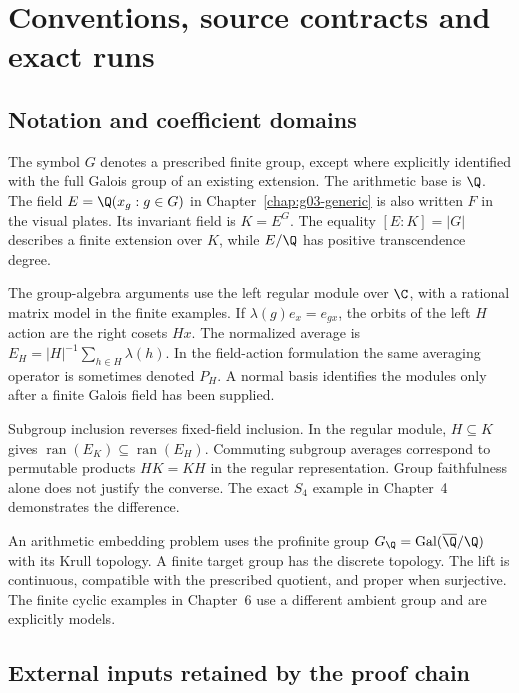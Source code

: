 \chapter{Conventions, source contracts and exact runs}
\label{app:g09-evidence}

\section{Notation and coefficient domains}

The symbol $G$ denotes a prescribed finite group, except where explicitly identified with the full Galois group of an existing extension. The arithmetic base is $\Q$. The field $E=\Q(x_g:g\in G)$ in Chapter~\ref{chap:g03-generic} is also written $F$ in the visual plates. Its invariant field is $K=E^G$. The equality $[E:K]=|G|$ describes a finite extension over $K$, while $E/\Q$ has positive transcendence degree.

The group-algebra arguments use the left regular module over $\C$, with a rational matrix model in the finite examples. If $\lambda(g)e_x=e_{gx}$, the orbits of the left $H$ action are the right cosets $Hx$. The normalized average is $E_H=|H|^{-1}\sum_{h\in H}\lambda(h)$. In the field-action formulation the same averaging operator is sometimes denoted $P_H$. A normal basis identifies the modules only after a finite Galois field has been supplied.

Subgroup inclusion reverses fixed-field inclusion. In the regular module, $H\subseteq K$ gives $\operatorname{ran}(E_K)\subseteq\operatorname{ran}(E_H)$. Commuting subgroup averages correspond to permutable products $HK=KH$ in the regular representation. Group faithfulness alone does not justify the converse. The exact $S_4$ example in Chapter~4 demonstrates the difference.

An arithmetic embedding problem uses the profinite group $G_{\Q}=\Gal(\overline{\Q}/\Q)$ with its Krull topology. A finite target group has the discrete topology. The lift is continuous, compatible with the prescribed quotient, and proper when surjective. The finite cyclic examples in Chapter~6 use a different ambient group and are explicitly models.

\section{External inputs retained by the proof chain}

